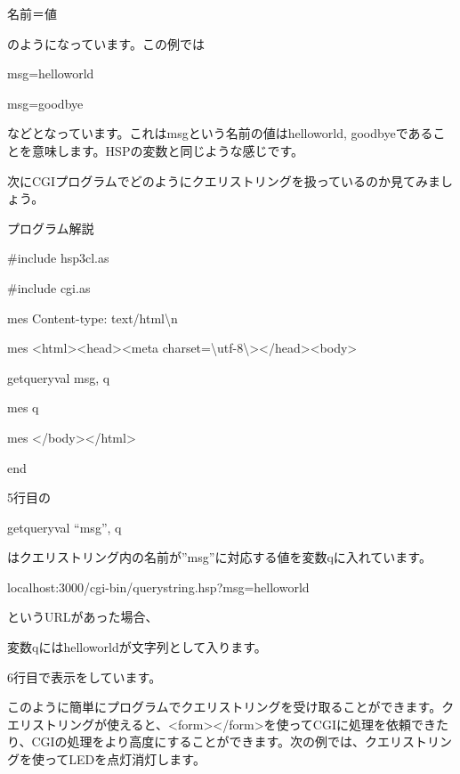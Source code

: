 \documentclass[a4paper,12pt,dvipdfmx]{jarticle}
\begin{document}
名前＝値

のようになっています。この例では

msg=helloworld

msg=goodbye

などとなっています。これはmsgという名前の値はhelloworld,
goodbyeであることを意味します。HSPの変数と同じような感じです。

次にCGIプログラムでどのようにクエリストリングを扱っているのか見てみましょう。


\bigskip

プログラム解説



\centering
\begin{boxedminipage}{16.233cm}
	\#include {\textquotedbl}hsp3cl.as{\textquotedbl}

	\#include {\textquotedbl}cgi.as{\textquotedbl}

	mes {\textquotedbl}Content-type: text/html{\textbackslash}n{\textquotedbl}

	mes {\textquotedbl}{\textless}html{\textgreater}{\textless}head{\textgreater}{\textless}meta
	charset={\textbackslash}{\textquotedbl}utf-8{\textbackslash}{\textquotedbl}{\textgreater}{\textless}/head{\textgreater}{\textless}body{\textgreater}{\textquotedbl}

	getqueryval {\textquotedbl}msg{\textquotedbl}, q

	mes q

	mes {\textquotedbl}{\textless}/body{\textgreater}{\textless}/html{\textgreater}{\textquotedbl}

	end
\end{boxedminipage}
\flushleft


\bigskip


\bigskip

5行目の

getqueryval “msg”, q

はクエリストリング内の名前が”msg”に対応する値を変数qに入れています。

localhost:3000/cgi-bin/querystring.hsp?msg=helloworld

というURLがあった場合、

変数qにはhelloworldが文字列として入ります。

6行目で表示をしています。

このように簡単にプログラムでクエリストリングを受け取ることができます。クエリストリングが使えると、{\textless}form{\textgreater}{\textless}/form{\textgreater}を使ってCGIに処理を依頼できたり、CGIの処理をより高度にすることができます。次の例では、クエリストリングを使ってLEDを点灯消灯します。
\end{document}
